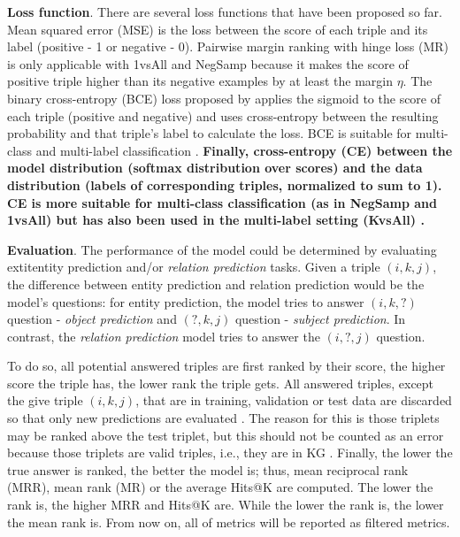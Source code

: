 \noindent\textbf{Loss function}. There are several loss functions that have been proposed so far. Mean squared error (MSE) is the loss between the score of each triple and its label (positive - 1 or negative - 0). Pairwise margin ranking with hinge loss (MR) is only applicable with 1vsAll and NegSamp because it makes the score of positive triple higher than its negative examples by at least the margin $\eta$. The binary cross-entropy (BCE) loss proposed by \citet{trouillon2016complex} applies the sigmoid to the score of each triple (positive and negative) and uses cross-entropy between the resulting probability and that triple’s label to calculate the loss. BCE is suitable for multi-class and multi-label classification \citep{Ruffinelli2020You}. \textbf{Finally, cross-entropy (CE) between the model distribution
(softmax distribution over scores) and the data distribution (labels of corresponding triples, normalized
to sum to 1). CE is more suitable for multi-class classification (as in NegSamp and 1vsAll)
but has also been used in the multi-label setting (KvsAll) \citep{Ruffinelli2020You}.}
\newline

\noindent\textbf{Evaluation}. The performance of the model could be determined by evaluating extit{entity prediction} and/or \textit{relation prediction} tasks. Given a triple $(i,k,j)$, the difference between entity prediction and relation prediction would be the model's questions: for entity prediction, the model tries to answer $(i,k,?)$ question - \textit{object prediction} and $(?,k,j)$ question - \textit{subject prediction}. In contrast, the \textit{relation prediction} model tries to answer the $(i,?,j)$ question. 

To do so, all potential answered triples are first ranked by their score, the higher score the triple has, the lower rank the triple gets. All answered triples, except the give triple $(i,k,j)$, that are in training, validation or test data are discarded so that only new predictions are evaluated \citep{Ruffinelli2020You}. The reason for this is those triplets may be ranked above the test triplet, but this should not be counted as an error because those triplets are valid triples, i.e., they are in KG \citep{bordes2013translating}. Finally, the lower the true answer is ranked, the better the model is; thus, mean reciprocal rank (MRR), mean rank (MR) or the average Hits@K are computed. The lower the rank is, the higher MRR and Hits@K are. While the lower the rank is, the lower the mean rank is. From now on, all of metrics will be reported as filtered metrics.


